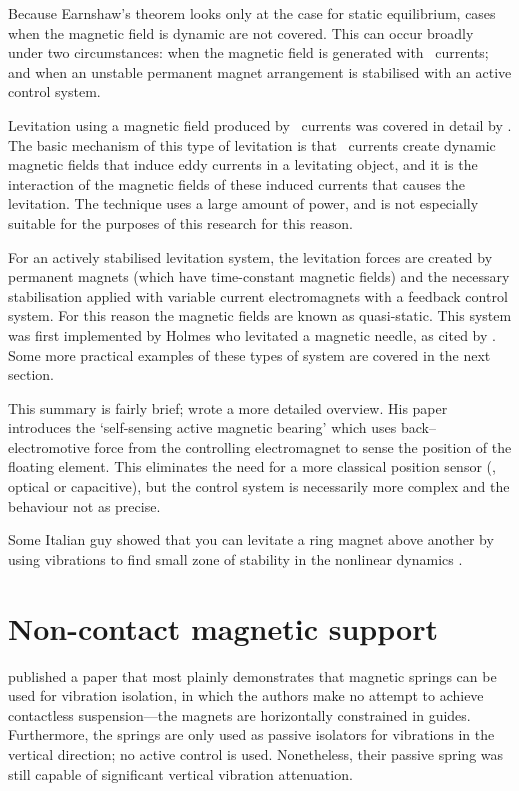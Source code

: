 Because Earnshaw's theorem looks only at the case for static equilibrium,
cases when the magnetic field is dynamic are not covered. This can occur
broadly under two circumstances: when the magnetic field is generated with
\AC\ currents; and when an unstable permanent magnet arrangement is stabilised
with an active control system.

Levitation using a magnetic field produced by \AC\ currents was covered in
detail by \textcite{laithwaite1965}. The basic mechanism of this type of
levitation is that \AC\ currents create dynamic magnetic fields that induce
eddy currents in a levitating object, and it is the interaction of the
magnetic fields of these induced currents that causes the levitation. The
technique uses a large amount of power, and is not especially suitable for the
purposes of this research for this reason.

For an actively stabilised levitation system, the levitation forces are
created by permanent magnets (which have time-constant magnetic fields) and
the necessary stabilisation applied with variable current electromagnets with
a feedback control system. For this reason the magnetic fields are known as
quasi-static. This system was first implemented by Holmes who levitated a
magnetic needle, as cited by \textcite{boerdijk1956a}. Some more practical
examples of these types of system are covered in the next section.

This summary is fairly brief; \textcite{bleuler1992} wrote a more detailed
overview. His paper introduces the `self-sensing active magnetic bearing'
\cite{vischer1993} which uses back--electromotive force from the controlling
electromagnet to sense the position of the floating element. This eliminates
the need for a more classical position sensor (\eg, optical or capacitive),
but the control system is necessarily more complex and the behaviour not as
precise.

Some Italian guy showed that you can levitate a ring magnet
above another by using vibrations to find small zone of
stability in the nonlinear dynamics \cite{bassani2007}.


\section{Non-contact magnetic support}

\textcite{puppin2002} published a paper that most plainly demonstrates that
magnetic springs can be used for vibration isolation, in which the authors
make no attempt to achieve contactless suspension—the magnets are horizontally
constrained in guides. Furthermore, the springs are only used as passive
isolators for vibrations in the vertical direction; no active control is used.
Nonetheless, their passive spring was still capable of significant vertical
vibration attenuation.

